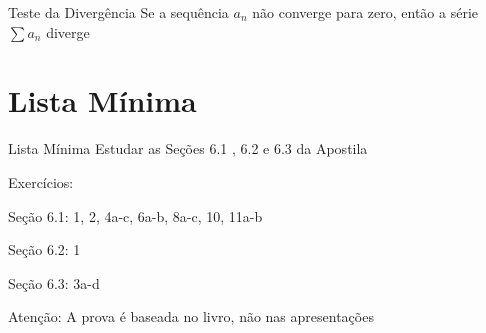 \begin{frame}{Teste da Divergência}
	Se a sequência $a_n$ não converge para zero, então a série $\sum a_n$ diverge
\end{frame}

\section{Lista Mínima}

\begin{frame}{Lista Mínima}
  Estudar as Seções 6.1 , 6.2 e 6.3 da Apostila

  \vfill
  Exercícios:

  \quad Seção 6.1: 1, 2, 4a-c, 6a-b, 8a-c, 10, 11a-b

  \quad Seção 6.2: 1

  \quad Seção 6.3: 3a-d

  \vfill
  Atenção: A prova é baseada no livro, não nas apresentações
\end{frame}



